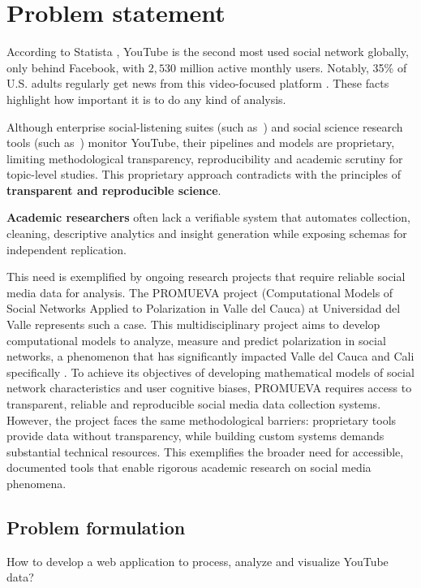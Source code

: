 \chapter{Problem statement}
\label{chap:problem_statement}

According to Statista \textcite{statista2025social}, YouTube is the second most used social network globally, only behind Facebook, with \(2,530\) million active monthly users. Notably, 35\% of U.S. adults regularly get news from this video-focused platform \autocite{pewresearch2025social}. These facts highlight how important it is to do any kind of analysis.

Although enterprise social-listening suites (such as~\cite{talkwalker, meltwater}) and social science research tools (such as~\cite{communalytic}) monitor YouTube, their pipelines and models are proprietary, limiting methodological transparency, reproducibility and academic scrutiny for topic-level studies. This proprietary approach contradicts with the principles of \textbf{transparent and reproducible science}.

\textbf{Academic researchers} often lack a verifiable system that automates collection, cleaning, descriptive analytics and insight generation while exposing schemas for independent replication.

This need is exemplified by ongoing research projects that require reliable social media data for analysis. The PROMUEVA project (Computational Models of Social Networks Applied to Polarization in Valle del Cauca) at Universidad del Valle represents such a case. This multidisciplinary project aims to develop computational models to analyze, measure and predict polarization in social networks, a phenomenon that has significantly impacted Valle del Cauca and Cali specifically \autocite{promueva_project}. To achieve its objectives of developing mathematical models of social network characteristics and user cognitive biases, PROMUEVA requires access to transparent, reliable and reproducible social media data collection systems. However, the project faces the same methodological barriers: proprietary tools provide data without transparency, while building custom systems demands substantial technical resources. This exemplifies the broader need for accessible, documented tools that enable rigorous academic research on social media phenomena.

\section{Problem formulation}

How to develop a web application to process, analyze and visualize YouTube data?
